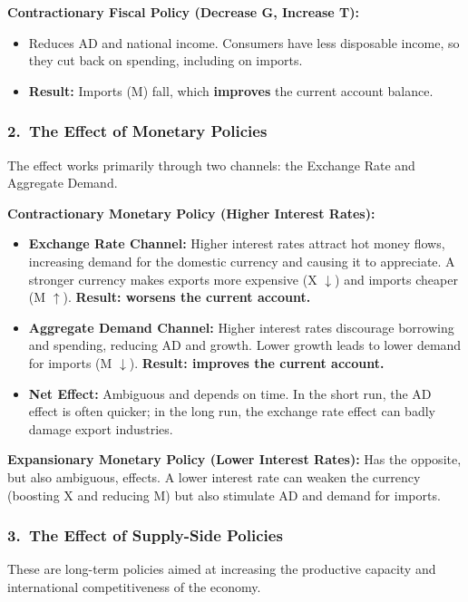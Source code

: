 \documentclass[11pt, a4paper, twoside]{book}
\begin{document}
\textbf{Contractionary Fiscal Policy (Decrease G, Increase T):}
\begin{itemize}
  \item Reduces AD and national income. Consumers have less disposable income, so they cut back on spending, including on imports.
  \item \textbf{Result:} Imports (M) fall, which \textbf{improves} the current account balance.
\end{itemize}

\subsubsection{2.\ The Effect of Monetary Policies}

The effect works primarily through two channels: the Exchange Rate and Aggregate Demand.

\textbf{Contractionary Monetary Policy (Higher Interest Rates):}
\begin{itemize}
  \item \textbf{Exchange Rate Channel:} Higher interest rates attract hot money flows, increasing demand for the domestic currency and causing it to appreciate. A stronger currency makes exports more expensive (X $\downarrow$) and imports cheaper (M $\uparrow$). \textbf{Result: worsens the current account.}
  \item \textbf{Aggregate Demand Channel:} Higher interest rates discourage borrowing and spending, reducing AD and growth. Lower growth leads to lower demand for imports (M $\downarrow$). \textbf{Result: improves the current account.}
  \item \textbf{Net Effect:} Ambiguous and depends on time. In the short run, the AD effect is often quicker; in the long run, the exchange rate effect can badly damage export industries.
\end{itemize}

\textbf{Expansionary Monetary Policy (Lower Interest Rates):} Has the opposite, but also ambiguous, effects. A lower interest rate can weaken the currency (boosting X and reducing M) but also stimulate AD and demand for imports.

\subsubsection{3.\ The Effect of Supply-Side Policies}

These are long-term policies aimed at increasing the productive capacity and international competitiveness of the economy.
\end{document}
